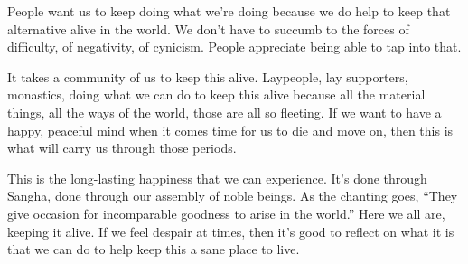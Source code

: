 People want us to keep doing what we're doing because we do help to keep that alternative alive in the world. We don't have to succumb to the forces of difficulty, of negativity, of cynicism. People appreciate being able to tap into that.

It takes a community of us to keep this alive. Laypeople, lay supporters, monastics, doing what we can do to keep this alive because all the material things, all the ways of the world, those are all so fleeting. If we want to have a happy, peaceful mind when it comes time for us to die and move on, then this is what will carry us through those periods.

This is the long-lasting happiness that we can experience. It's done through Sangha, done through our assembly of noble beings. As the chanting goes, ``They give occasion for incomparable goodness to arise in the world.'' Here we all are, keeping it alive. If we feel despair at times, then it's good to reflect on what it is that we can do to help keep this a sane place to live.
